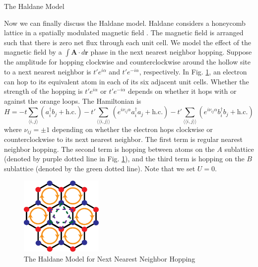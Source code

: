 \documentclass[a4paper,12pt]{article}
\renewcommand{\vec}[1]{\boldsymbol{\mathbf{#1}}}
\begin{document}
\begin{section}{The Haldane Model}

Now we can finally discuss the Haldane model.  Haldane considers a honeycomb lattice in a spatially modulated magnetic field \cite{haldane_prl}.  The magnetic field is arranged such that there is zero net flux through each unit cell.  We model the effect of the magnetic field by a $\int \vec{A} \cdot d\vec{r}$ phase in the next nearest neighbor hopping.  Suppose the amplitude for hopping clockwise and counterclockwise around the hollow site to a next nearest neighbor is $t' e^{i\alpha}$ and $t' e^{-i\alpha}$, respectively.  In Fig. \ref{fig:haldane}, an electron can hop to its equivalent atom in each of its six adjacent unit cells.  Whether the strength of the hopping is $t' e^{i\alpha}$ or $t' e^{-i\alpha}$ depends on whether it hops with or against the orange loops.  The Hamiltonian is
\begin{equation}
\label{eq:haldane_hamiltonian}
H= - t \sum_{\langle i,j \rangle} \left( a_i^\dagger b_j + \text{h.c.} \right)-t' \sum_{\langle \langle i,j \rangle \rangle} \left( e^{i \nu_{ij} \alpha} a_i^\dagger a_j + \text{h.c.} \right)-t' \sum_{\langle \langle i,j \rangle \rangle} \left( e^{i \nu_{ij} \alpha} b_i^\dagger b_j + \text{h.c.} \right)
\end{equation}
where $\nu_{ij}=\pm 1$ depending on whether the electron hops clockwise or counterclockwise to its next nearest neighbor.  The first term is regular nearest neighbor hopping.  The second term is hopping between atoms on the $A$ sublattice (denoted by purple dotted line in Fig. \ref{fig:haldane}), and the third term is hopping on the $B$ sublattice (denoted by the green dotted line).  Note that we set $U=0$.

\begin{figure}[h!]
\centering
\includegraphics[width=40mm,keepaspectratio=true]{haldane_model.png}
\caption{The Haldane Model for Next Nearest Neighbor Hopping}\label{fig:haldane}
\end{figure}


\end{section}
\end{document}
